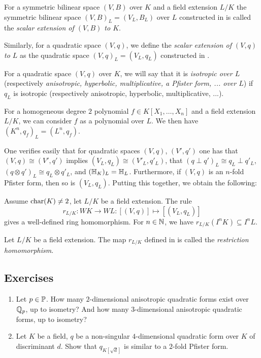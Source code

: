 \documentclass[12pt, leqno, british]{amsart}
\begin{document}
\begin{defi}\label{D:scalar-extension}
For a symmetric bilinear space $(V, B)$ over $K$ and a field extension $L/K$ the symmetric bilinear space $(V, B)_L = (V_L, B_L)$ over $L$ constructed in  is called the \emph{scalar extension of $(V, B)$ to $K$}.

Similarly, for a quadratic space $(V, q)$, we define the \emph{scalar extension of $(V, q)$ to $L$} as the quadratic space $(V, q)_L = (V_L, q_L)$ constructed in .

For a quadratic space $(V, q)$ over $K$, we will say that it is \emph{isotropic over $L$} (respectively \emph{anisotropic, hyperbolic, multiplicative, a Pfister form, ... over $L$}) if $q_L$ is isotropic (respectively anisotropic, hyperbolic, multiplicative, ...).
\end{defi}
\begin{rem}
For a homogeneous degree $2$ polynomial $f \in K[X_1, \ldots, X_n]$ and a field extension $L/K$, we can consider $f$ as a polynomial over $L$.
We then have $(K^n, q_f)_L = (L^n, q_f)$.
\end{rem}
One verifies easily that for quadratic spaces $(V, q)$, $(V', q')$ one has that $(V, q) \cong (V', q')$ implies $(V_L, q_L) \cong (V'_L, q'_L)$, that $(q \perp q')_L \cong q_L \perp q'_L$, $(q \otimes q')_L \cong q_L \otimes q'_L$, and $(\mathbb{H}_K)_L = \mathbb{H}_L$. Furthermore, if $(V, q)$ is an $n$-fold Pfister form, then so is $(V_L, q_L)$.
Putting this together, we obtain the following:
\begin{prop}\label{P:restriction-homomorphism}
Assume $\operatorname{char}(K) \neq 2$, let $L/K$ be a field extension.
The rule
$$ r_{L/K} : WK \to WL : [(V, q)] \mapsto [(V_L, q_L)] $$
gives a well-defined ring homomorphism.
For $n \in \mathbb N$, we have $r_{L/K}(I^n K) \subseteq I^nL$.
\end{prop}
\begin{defi}\label{D:restriction-homomorphism}
Let $L/K$ be a field extension.
The map $r_{L/K}$ defined in  is called the \emph{restriction homomorphism}.
\end{defi}

\subsection{Exercises}
\begin{enumerate}
\item Let $p \in \mathbb P$.
How many $2$-dimensional anisotropic quadratic forms exist over $\mathbb Q_p$, up to isometry?
And how many $3$-dimensional anisotropic quadratic forms, up to isometry?
\item Let $K$ be a field, $q$ be a non-singular $4$-dimensional quadratic form over $K$ of discriminant $d$.
Show that $q_{K[\sqrt{d}]}$ is similar to a $2$-fold Pfister form.
\end{enumerate}
\end{document}
